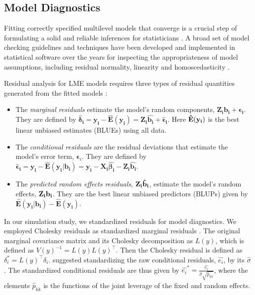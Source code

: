 \documentclass[12pt]{article}
\begin{document}
\subsection{Model Diagnostics}

Fitting correctly specified multilevel models that converge is a crucial
step of formulating a solid and reliable inferences for statisticians
\citep{Gelman_hill_2006}. A broad set of model checking guidelines and
techniques have been developed and implemented in statistical software
over the years for inspecting the appropriateness of model assumptions,
including residual normality, linearity and homoscedasticity
\citep{pinheiro2000linear, Cheng2010-ec, Bates2015}.

Residual analysis for LME models requires three types of residual
quantities generated from the fitted models
\citep{santos2007residual, haslett1998residuals}:

\begin{itemize}
\item
  The \emph{marginal residuals} estimate the model's random components,
  \(\boldsymbol{Z_i b_i + \epsilon_{i}}\). They are defined by
  \(\boldsymbol{\hat \delta_i = y_i - \hat{E}(y_i) = Z_i\hat{b_i} + \hat \epsilon_{i}}\).
  Here \(\bf{\hat{E}(y_i)}\) is the best linear unbiased estimates
  (BLUEs) using all data.
\item
  The \emph{conditional residuals} are the residual deviations that
  estimate the model's error term, \(\boldsymbol\epsilon_i\). They are
  defined by
  \(\boldsymbol{\hat \epsilon_i = y_i - \hat{E}(y_i|b_i) = y_i - X_i\hat{\beta_i} - Z_i\hat{b_i}}\).
\item
  The \emph{predicted random effects residuals}, \(\bf{Z_i \hat b_i}\),
  estimate the model's random effects, \(\bf{Z_i b_i}\). They are the
  best linear unbiased predictors (BLUPs) given by
  \(\boldsymbol{\hat E(y_i|b_i)-\hat E(y_i)}\).
\end{itemize}

In our simulation study, we standardized residuals for model
diagnostics. We employed Cholesky residuals as standardized marginal
residuals \citep{houseman2004cholesky}. The original marginal covariance
matrix and its Cholesky decomposition as \(L(y)\), which is defined as
\(V(y)^{-1} = L(y)L(y)^\top\). Then the Cholesky residual is defined as
\(\delta_i^* = L(y)^\top \delta_i\). \citet{santos2007residual}
suggested standardizing the raw conditional residuals, \(\hat {e_i}\),
by its \(\hat \sigma\). The standardized conditional residuals are thus
given by
\(\hat {e_i}^* = \frac{\hat {e_i}}{\hat \sigma \sqrt{\hat p_{kk}}}\),
where the elements \(\hat p_{kk}\) is the functions of the joint
leverage of the fixed and random effects.
\end{document}
